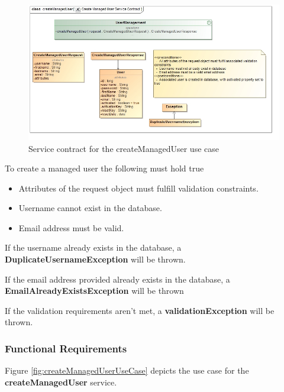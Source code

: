 \begin{figure}[H]
	\begin{center}
		\includegraphics[scale=0.55]{../Diagrams and Charts/Users/Create Managed User Service Contract.jpg}
		\caption{Service contract for the createManagedUser use case}
		\label{fig:createManagedUserServicesContract}
	\end{center}
\end{figure}

To create a managed user the following must hold true
\begin{itemize}
	\item Attributes of the request object must fulfill validation constraints.
	\item Username cannot exist in the database.
	\item Email address must be valid.
\end{itemize}

If the username already exists in the database, a \textbf{DuplicateUsernameException} will be thrown.

If the email address provided already exists in the database, a \textbf{EmailAlreadyExistsException}
will be thrown

If the validation requirements aren't met, a \textbf{validationException} will be thrown.

\subsubsection{Functional Requirements}
Figure \ref{fig:createManagedUserUseCase} depicts the use case for the \textbf{createManagedUser} service.

